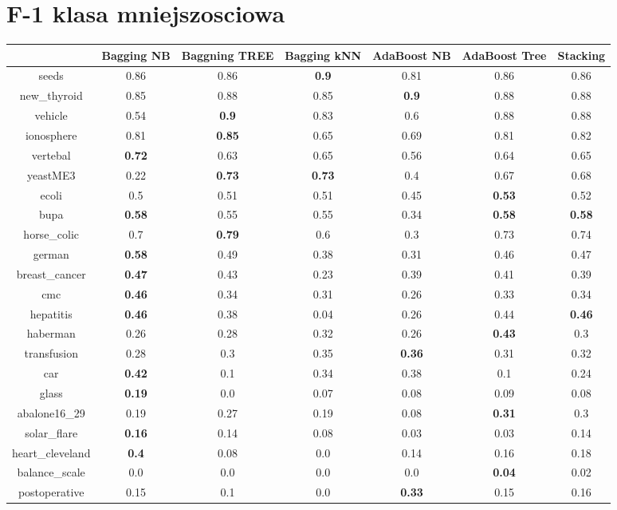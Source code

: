 \documentclass{article}%
\begin{document}
\section*{F{-}1 klasa mniejszosciowa}%
\begin{tabular}{c|cccccc}%
&Bagging NB&Baggning TREE&Bagging kNN&AdaBoost NB&AdaBoost Tree&Stacking\\%
\hline%
seeds&0.86&0.86&\textbf{0.9}&0.81&0.86&0.86\\%
new\_thyroid&0.85&0.88&0.85&\textbf{0.9}&0.88&0.88\\%
vehicle&0.54&\textbf{0.9}&0.83&0.6&0.88&0.88\\%
ionosphere&0.81&\textbf{0.85}&0.65&0.69&0.81&0.82\\%
vertebal&\textbf{0.72}&0.63&0.65&0.56&0.64&0.65\\%
yeastME3&0.22&\textbf{0.73}&\textbf{0.73}&0.4&0.67&0.68\\%
ecoli&0.5&0.51&0.51&0.45&\textbf{0.53}&0.52\\%
bupa&\textbf{0.58}&0.55&0.55&0.34&\textbf{0.58}&\textbf{0.58}\\%
horse\_colic&0.7&\textbf{0.79}&0.6&0.3&0.73&0.74\\%
german&\textbf{0.58}&0.49&0.38&0.31&0.46&0.47\\%
breast\_cancer&\textbf{0.47}&0.43&0.23&0.39&0.41&0.39\\%
cmc&\textbf{0.46}&0.34&0.31&0.26&0.33&0.34\\%
hepatitis&\textbf{0.46}&0.38&0.04&0.26&0.44&\textbf{0.46}\\%
haberman&0.26&0.28&0.32&0.26&\textbf{0.43}&0.3\\%
transfusion&0.28&0.3&0.35&\textbf{0.36}&0.31&0.32\\%
car&\textbf{0.42}&0.1&0.34&0.38&0.1&0.24\\%
glass&\textbf{0.19}&0.0&0.07&0.08&0.09&0.08\\%
abalone16\_29&0.19&0.27&0.19&0.08&\textbf{0.31}&0.3\\%
solar\_flare&\textbf{0.16}&0.14&0.08&0.03&0.03&0.14\\%
heart\_cleveland&\textbf{0.4}&0.08&0.0&0.14&0.16&0.18\\%
balance\_scale&0.0&0.0&0.0&0.0&\textbf{0.04}&0.02\\%
postoperative&0.15&0.1&0.0&\textbf{0.33}&0.15&0.16\\%
\end{tabular}

%
\end{document}
